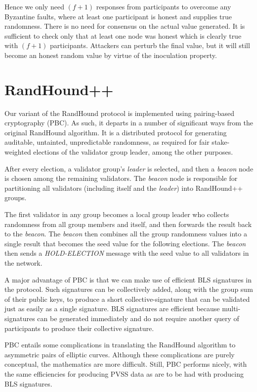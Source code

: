 \documentclass[8pt,fleqn,openany]{book}
\begin{document}
Hence we only need $(f + 1)$ responses from participants to overcome any Byzantine faults, where at least one participant is honest and supplies true randomness. There is no need for consensus on the actual value generated. It is sufficient to check only that at least one node was honest which is clearly true with $(f + 1)$ participants. Attackers can perturb the final value, but it will still become an honest random value by virtue of the inoculation property.

\section{RandHound++}
Our variant of the RandHound protocol is implemented using pairing-based cryptography (PBC). As such, it departs in a number of significant ways from the original RandHound algorithm. It is a distributed protocol for generating auditable, untainted, unpredictable randomness, as required for fair stake-weighted elections of the validator group leader, among the other purposes.

After every election, a validator group's \textit{leader} is selected, and then a \textit{beacon} node is chosen among the remaining validators. The \textit{beacon} node is responsible for partitioning all validators (including itself and the \textit{leader}) into RandHound++ groups. 

The first validator in any group becomes a local group leader who collects randomness from all group members and itself, and then forwards the result back to the \textit{beacon}. The \textit{beacon} then combines all the group randomness values into a single result that becomes the seed value for the following elections. The \textit{beacon} then sends a \textit{HOLD-ELECTION} message with the seed value to all validators in the network.

A major advantage of PBC is that we can make use of efficient BLS signatures\cite{c16} in the protocol. Such signatures can be collectively added, along with the group sum of their public keys, to produce a short collective-signature that can be validated just as easily as a single signature. BLS signatures are efficient because multi-signatures can be generated immediately and do not require another query of participants to produce their collective signature.

PBC entails some complications in translating the RandHound algorithm to asymmetric pairs of elliptic curves. Although these complications are purely conceptual, the mathematics are more difficult. Still, PBC performs nicely, with the same efficiencies for producing PVSS data as are to be had with producing BLS signatures.
\end{document}
